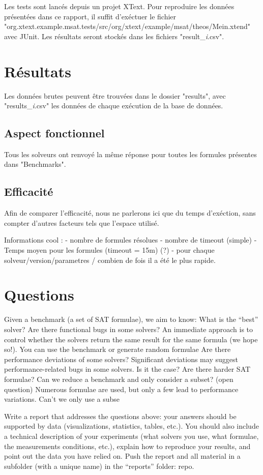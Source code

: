 \documentclass[11pt,a4paper]{article}
\begin{document}
Les tests sont lancés depuis un projet XText. Pour reproduire les données présentées dans ce rapport, il suffit d'exéctuer le fichier "org.xtext.example.msat.tests/src/org/xtext/example/msat/theos/Mein.xtend" avec JUnit. Les résultats seront stockés dans les fichiers "result\_\textit{i}.csv".


\section{Résultats}

Les données brutes peuvent être trouvées dans le dossier "results", avec "results\_\textit{i}.csv" les données de chaque exécution de la base de données.

\subsection{Aspect fonctionnel}

Tous les solveurs ont renvoyé la même réponse pour toutes les formules présentes dans "Benchmarks".

\subsection{Efficacité}

Afin de comparer l'efficacité, nous ne parlerons ici que du temps d'exéction, sans compter d'autres facteurs tels que l'espace utilisé.

Informations cool : 
- nombre de formules résolues
- nombre de timeout (simple)
- Temps moyen pour les formules (timeout = 15m) (?)
- pour chaque solveur/version/parametres / combien de fois il a été le plus rapide.


\section{Questions}
Given a benchmark (a set of SAT formulae), we aim to know:
 What is the “best” solver?
 Are there functional bugs in some solvers?
 An immediate approach is to control whether the solvers return the same
result for the same formula (we hope so!). You can use the benchmark or
generate random formulae
 Are there performance deviations of some solvers?
 Significant deviations may suggest performance-related bugs in some
solvers. Is it the case?
 Are there harder SAT formulae?
 Can we reduce a benchmark and only consider a subset? (open question)
 Numerous formulae are used, but only a few lead to performance variations.
Can’t we only use a subse

Write a report that addresses the questions above: your answers should be
supported by data (visualizations, statistics, tables, etc.). You should also include a
technical description of your experiments (what solvers you use, what formulae, the
measurements conditions, etc.), explain how to reproduce your results, and point out
the data you have relied on. Push the report and all material in a subfolder (with a
unique name) in the “reports” folder:
repo.
\end{document}
